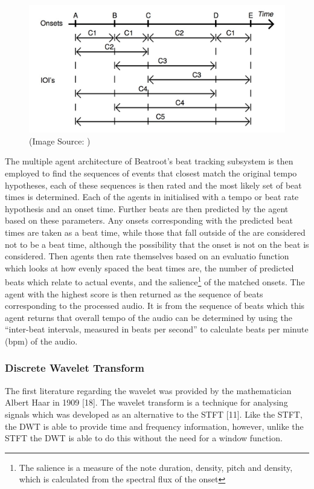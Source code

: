 \documentclass[a4paper, 11pt]{article}
\begin{document}
\begin{figure}[h]
	\centering
	\includegraphics[scale=0.25]{br-clusters}
	\caption{(Image Source: \cite{dixon4})}
	\label{fig: br-clusters}
\end{figure}

The multiple agent architecture of Beatroot's beat tracking subsystem is then employed to find the sequences of events that closest match the original tempo hypotheses, each of these sequences is then rated and the most likely set of beat times is determined. Each of the agents in initialised with a tempo or beat rate hypothesis and an onset time. Further beats are then predicted by the agent based on these parameters. Any onsets corresponding with the predicted beat times are taken as a beat time, while those that fall outside of the are considered not to be a beat time, although the possibility that the onset is not on the beat is considered. Then agents then rate themselves based on an evaluatio function which looks at how evenly spaced the beat times are, the number of predicted beats which relate to actual events, and the salience\footnote{The salience is a measure of the note duration, density, pitch and density\cite{dixon1}, which is calculated from the spectral flux of the onset\cite{dixon4}} of the matched onsets. The agent with the highest score is then returned as the sequence of beats corresponding to the processed audio\cite{dixon4}. It is from the sequence of beats which this agent returns that overall tempo of the audio can be determined by using the ``inter-beat intervals, measured in beats per second''\cite{dixon1} to calculate beats per minute (bpm) of the audio.


\subsubsection{Discrete Wavelet Transform}
The first literature regarding the wavelet was provided by the mathematician Albert Haar in 1909 [18]. The wavelet transform is a technique for analysing signals which was developed as an alternative to the STFT [11]. Like the STFT, the DWT is able to provide time and frequency information, however, unlike the STFT the DWT is able to do this without the need for a window function. 
\end{document}
